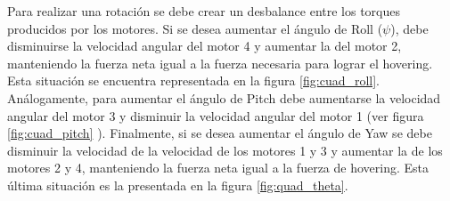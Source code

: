 \documentclass[main]{subfiles}
\begin{document}
\begin{figure}
\centering
{}
\caption{}
\end{figure}

Para realizar una rotaci\'on se debe crear un desbalance entre los torques producidos por los motores. Si se desea aumentar el \'angulo de Roll ($\psi$), debe disminuirse la velocidad  angular del motor 4 y aumentar la del motor 2, manteniendo la fuerza neta igual a la fuerza necesaria para lograr el hovering. Esta situaci\'on se encuentra representada en la figura \ref{fig:cuad_roll}. Análogamente, para aumentar el \'angulo de Pitch debe aumentarse la velocidad angular del motor 3 y disminuir la velocidad angular del motor 1 (ver figura \ref{fig:cuad_pitch} ). Finalmente, si se desea aumentar el \'angulo de Yaw se debe disminuir la velocidad de la velocidad de los motores 1 y 3 y aumentar la de los motores 2 y 4, manteniendo la fuerza neta igual a la fuerza de hovering. Esta \'ultima situaci\'on es la presentada en la figura \ref{fig:quad_theta}.
\end{document}
